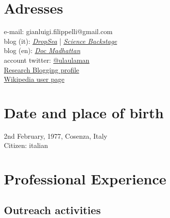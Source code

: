 \section{Adresses}

\begin{flushleft}
	e-mail: gianluigi.filippelli@gmail.com\\
	blog (it): \href{http://dropseaofulaula.blogspot.it/}{\em DropSea} | \href{http://sciencebackstage.blogspot.it/}{\em Science Backstage}\\
	blog (en): \href{http://docmadhattan.fieldofscience.com/}{\em Doc Madhattan}\\
	account twitter: \href{https://twitter.com/ulaulaman}{@ulaulaman}\\
	\href{http://researchblogging.org/blogger/home/id/2181}{Research Blogging profile}\\
	\href{https://it.wikipedia.org/wiki/Utente:Gianluigi}{Wikipedia user page}
\end{flushleft}

\section{Date and place of birth}
\begin{flushleft}
	2nd February, 1977, Cosenza, Italy\\
	Citizen: italian
\end{flushleft}

\section{Professional Experience}
\subsection*{Outreach activities}

